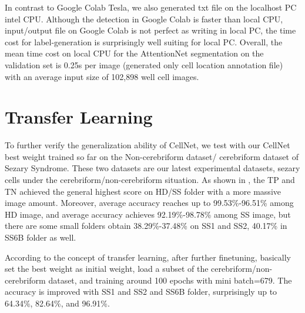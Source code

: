 In contrast to Google Colab Tesla, we also generated txt file on the localhost PC  intel CPU. Although the detection in  Google Colab is faster than local CPU, input/output file on Google Colab is not perfect as writing in local PC, the time cost for label-generation is surprisingly well suiting for local PC. Overall, the mean time cost on local CPU for the AttentionNet segmentation on the validation set is 0.25s per image (generated only cell location annotation file) with an average input size of 102,898 well cell images.


\section{Transfer Learning} %
\label{sub:amet}

To further verify the generalization ability of CellNet, we test with our CellNet best weight trained so far on the Non-cerebriform dataset/ cerebriform dataset of Sezary Syndrome. These two datasets are our latest experimental datasets, sezary cells under the cerebriform/non-cerebriform situation. As shown in \eg{}, the TP and TN achieved the general highest score on HD/SS folder with a more massive image amount. Moreover, average accuracy reaches up to 99.53\%-96.51\% among HD image, and average accuracy achieves 92.19\%-98.78\% among SS image, but there are some small folders obtain 38.29\%-37.48\% on SS1 and SS2, 40.17\% in SS6B folder as well. 

According to the concept of transfer learning, after further finetuning, basically set the best weight as initial weight, load a subset of the cerebriform/non-cerebriform dataset, and training around 100 epochs with mini batch=679. The accuracy is improved with SS1 and SS2 and SS6B folder, surprisingly up to 64.34\%, 82.64\%, and 96.91\%.


